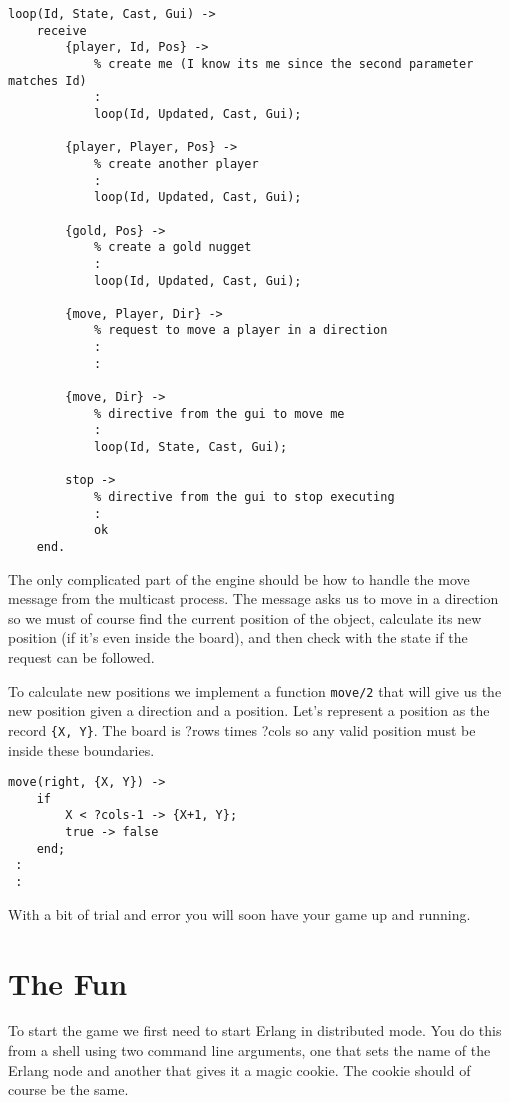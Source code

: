 \documentclass[a4paper,11pt]{article}
\begin{document}
\begin{verbatim}
loop(Id, State, Cast, Gui) ->
    receive 
        {player, Id, Pos} ->
            % create me (I know its me since the second parameter matches Id)
            :
            loop(Id, Updated, Cast, Gui);

        {player, Player, Pos} ->
            % create another player
            :
            loop(Id, Updated, Cast, Gui);

        {gold, Pos} ->
            % create a gold nugget
            :
            loop(Id, Updated, Cast, Gui);

        {move, Player, Dir} ->
            % request to move a player in a direction
            :
            :

        {move, Dir} ->
            % directive from the gui to move me
            :
            loop(Id, State, Cast, Gui);

        stop ->
            % directive from the gui to stop executing
            :
            ok
    end.
\end{verbatim}

The only complicated part of the engine should be how to handle the
move message from the multicast process. The message asks us to move
in a direction so we must of course find the current position of the
object, calculate its new position (if it's even inside the board),
and then check with the state if the request can be followed.

To calculate new positions we implement a function {\tt move/2} that
will give us the new position given a direction and a position. Let's
represent a position as the record {\tt \{X, Y\}}. The board is ?rows
times ?cols so any valid position must be inside these
boundaries.

\begin{verbatim}
move(right, {X, Y}) ->
    if 
        X < ?cols-1 -> {X+1, Y};
        true -> false
    end;
 :
 :
\end{verbatim}

With a bit of trial and error you will soon have your game up and
running. 


\section{The Fun}

To start the game we first need to start Erlang in distributed
mode. You do this from a shell using two command line arguments, one
that sets the name of the Erlang node and another that gives it a
magic cookie. The cookie should of course be the same.
\end{document}
